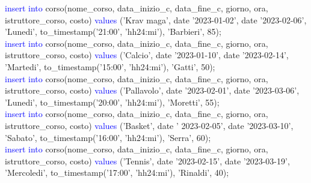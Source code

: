 \documentclass{article}
\begin{document}
\begin{flushleft}
{        \vspace{2mm}
        \hspace*{0.5em}\textcolor{blue}{insert into} corso(nome\_corso, data\_inizio\_c, data\_fine\_c, giorno, ora, \hspace*{0.0em} istruttore\_corso, costo) \textcolor{blue}{values} ('Krav maga', date '2023-01-02', date \hspace*{0.4em}'2023-02-06', 'Lunedi', to\_timestamp('21:00', 'hh24:mi'), 'Barbieri', 85); \\
        \vspace{2mm}
        \hspace*{0.5em}\textcolor{blue}{insert into} corso(nome\_corso, data\_inizio\_c, data\_fine\_c, giorno, ora, \hspace*{0.0em} istruttore\_corso, costo) \textcolor{blue}{values} ('Calcio', date '2023-01-10', date \hspace*{0.4em}'2023-02-14', 'Martedi', to\_timestamp('15:00', 'hh24:mi'), 'Gatti', 50); \\
        \vspace{2mm}
        \hspace*{0.5em}\textcolor{blue}{insert into} corso(nome\_corso, data\_inizio\_c, data\_fine\_c, giorno, ora, \hspace*{0.0em} istruttore\_corso, costo) \textcolor{blue}{values} ('Pallavolo', date '2023-02-01', date \hspace*{0.4em}'2023-03-06', 'Lunedi', to\_timestamp('20:00', 'hh24:mi'), 'Moretti', 55); \\
        \vspace{2mm}
        \hspace*{0.5em}\textcolor{blue}{insert into} corso(nome\_corso, data\_inizio\_c, data\_fine\_c, giorno, ora, \hspace*{0.0em} istruttore\_corso, costo) \textcolor{blue}{values} ('Basket', date ' 2023-02-05', date \hspace*{0.4em}'2023-03-10', 'Sabato', to\_timestamp('16:00', 'hh24:mi'), 'Serra', 60); \\
        \vspace{2mm}
        \hspace*{0.5em}\textcolor{blue}{insert into} corso(nome\_corso, data\_inizio\_c, data\_fine\_c, giorno, ora, \hspace*{0.0em} istruttore\_corso, costo) \textcolor{blue}{values} ('Tennis', date '2023-02-15', date '2023-03-19', \hspace*{0.4em}'Mercoledi', to\_timestamp('17:00', 'hh24:mi'), 'Rinaldi', 40); \\
}
\end{flushleft}
\end{document}
